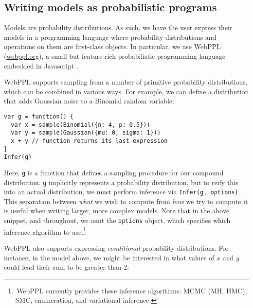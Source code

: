 \documentclass[10pt,letterpaper]{article}
\begin{document}

\subsection{Writing models as probabilistic programs}

Models are probability distributions.
As such, we have the user express their models in a programming language where probability distributions and operations on them are first-class objects.
In particular, we use WebPPL (\url{webppl.org}), a small but feature-rich probabilistic programming language embedded in Javascript \citep{dippl}.

WebPPL supports sampling from a number of primitive probability distributions, which can be combined in various ways. For example, we can define a distribution that adds Gaussian noise to a Binomial random variable:

\begin{lstlisting}[mathescape, label={code:forward-model-simple}]
var g = function() {
  var x = sample(Binomial({n: 4, p: 0.5}))
  var y = sample(Gaussian({mu: 0, sigma: 1}))
  x + y // function returns its last expression
}
Infer(g)
\end{lstlisting}
Here, \lstinline{g} is a function that defines a sampling procedure for our compound distribution.
\lstinline{g} implicitly represents a probability distribution, but to reify this into an actual distribution, we must perform inference via \texttt{Infer(g, options)}.
This separation between \emph{what} we wish to compute from \emph{how} we try to compute it is useful when writing larger, more complex models.
Note that in the above snippet, and throughout, we omit the \texttt{options} object, which specifies which inference algorithm to use.\footnote{\,WebPPL currently provides these inference algorithms: MCMC (MH, HMC), SMC, enumeration, and variational inference.}

WebPPL also supports expressing \emph{conditional} probability distributions.
For instance, in the model above, we might be interested in what values of $x$ and $y$ could lead their sum to be greater than 2:
\end{document}
